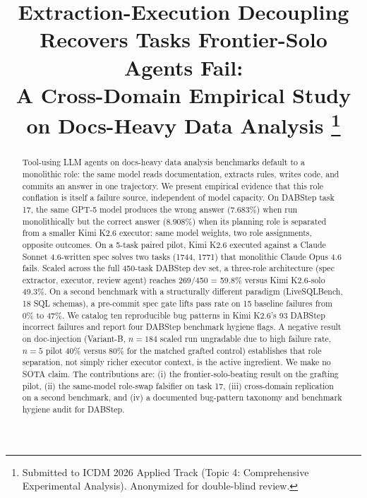 \documentclass[conference]{IEEEtran}
\newcommand{\Kimi}{Kimi K2.6}
\newcommand{\Opus}{Claude Opus 4.6}
\newcommand{\Sonnet}{Claude Sonnet 4.6}
\begin{document}
\title{Extraction-Execution Decoupling Recovers Tasks Frontier-Solo Agents Fail:\\
A Cross-Domain Empirical Study on Docs-Heavy Data Analysis%
\thanks{Submitted to ICDM 2026 Applied Track (Topic 4: Comprehensive Experimental Analysis). Anonymized for double-blind review.}}

\author{
}

\maketitle

\begin{abstract}
Tool-using LLM agents on docs-heavy data analysis benchmarks default to a monolithic role: the same model reads documentation, extracts rules, writes code, and commits an answer in one trajectory. We present empirical evidence that this role conflation is itself a failure source, independent of model capacity. On DABStep task 17, the same GPT-5 model produces the wrong answer (7.683\%) when run monolithically but the correct answer (8.908\%) when its planning role is separated from a smaller \Kimi{} executor: same model weights, two role assignments, opposite outcomes. On a 5-task paired pilot, \Kimi{} executed against a \Sonnet{}-written spec solves two tasks (1744, 1771) that monolithic \Opus{} fails. Scaled across the full 450-task DABStep dev set, a three-role architecture (spec extractor, executor, review agent) reaches 269/450 = 59.8\% versus \Kimi{}-solo 49.3\%. On a second benchmark with a structurally different paradigm (LiveSQLBench, 18 SQL schemas), a pre-commit spec gate lifts pass rate on 15 baseline failures from 0\% to 47\%. We catalog ten reproducible bug patterns in \Kimi{}'s 93 DABStep incorrect failures and report four DABStep benchmark hygiene flags. A negative result on doc-injection (Variant-B, $n=184$ scaled run ungradable due to high failure rate, $n=5$ pilot 40\% versus 80\% for the matched grafted control) establishes that role separation, not simply richer executor context, is the active ingredient. We make no SOTA claim. The contributions are: (i) the frontier-solo-beating result on the grafting pilot, (ii) the same-model role-swap falsifier on task 17, (iii) cross-domain replication on a second benchmark, and (iv) a documented bug-pattern taxonomy and benchmark hygiene audit for DABStep.
\end{abstract}
\end{document}

